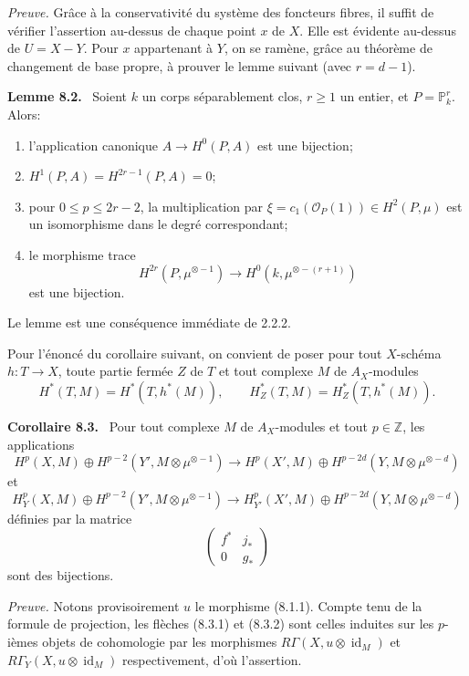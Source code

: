 \documentclass[11pt]{article}
\newenvironment{statement}[1]{\par\medskip\noindent\textbf{#1.}\ }{\par\medskip}
\begin{document}
\emph{Preuve.} Grâce à la conservativité du système des foncteurs fibres, il suffit de vérifier l'assertion au-dessus de chaque point $x$ de $X$. Elle est évidente au-dessus de $U=X-Y$. Pour $x$ appartenant à $Y$, on se ramène, grâce au théorème de changement de base propre, à prouver le lemme suivant (avec $r=d-1$).

\begin{statement}{Lemme 8.2}
Soient $k$ un corps séparablement clos, $r\ge1$ un entier, et $P=\mathbb P_k^r$. Alors:
\begin{enumerate}[label=\alph*)]
\item l'application canonique $A\to H^0(P,A)$ est une bijection;
\item $H^1(P,A)=H^{2r-1}(P,A)=0$;
\item pour $0\le p\le2r-2$, la multiplication par $\xi=c_1(\mathcal O_P(1))\in H^2(P,\mu)$ est un isomorphisme dans le degré correspondant;
\item le morphisme trace
\[
H^{2r}(P,\mu^{\otimes -1})\to H^0(k,\mu^{\otimes -(r+1)})
\]
est une bijection.
\end{enumerate}
\end{statement}

Le lemme est une conséquence immédiate de 2.2.2.

Pour l'énoncé du corollaire suivant, on convient de poser pour tout $X$-schéma $h:T\to X$, toute partie fermée $Z$ de $T$ et tout complexe $M$ de $A_X$-modules
\[
H^*(T,M)=H^*(T,h^*(M)),\qquad
H^*_Z(T,M)=H^*_Z(T,h^*(M)).
\]

\begin{statement}{Corollaire 8.3}
Pour tout complexe $M$ de $A_X$-modules et tout $p\in\mathbb Z$, les applications
\[
H^p(X,M)\oplus H^{p-2}(Y',M\otimes\mu^{\otimes -1})
\to
H^p(X',M)\oplus H^{p-2d}(Y,M\otimes\mu^{\otimes -d})
\tag{8.3.1}
\]
et
\[
H_Y^p(X,M)\oplus H^{p-2}(Y',M\otimes\mu^{\otimes -1})
\to
H_{Y'}^p(X',M)\oplus H^{p-2d}(Y,M\otimes\mu^{\otimes -d})
\tag{8.3.2}
\]
définies par la matrice
\[
\begin{pmatrix}
f^*&j_*\\
0&g_*
\end{pmatrix}
\]
sont des bijections.
\end{statement}

\emph{Preuve.} Notons provisoirement $u$ le morphisme (8.1.1). Compte tenu de la formule de projection, les flèches (8.3.1) et (8.3.2) sont celles induites sur les $p$-ièmes objets de cohomologie par les morphismes $R\Gamma(X,u\otimes\operatorname{id}_M)$ et $R\Gamma_Y(X,u\otimes\operatorname{id}_M)$ respectivement, d'où l'assertion.
\end{document}
